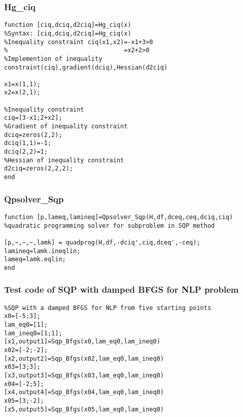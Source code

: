 \subsubsection{\bfseries Hg_ciq }
\label{6.5.6}
{\setmainfont{Courier New Bold} \scriptsize         
\begin{lstlisting}
function [ciq,dciq,d2ciq]=Hg_ciq(x)
%Syntax: [ciq,dciq,d2ciq]=Hg_ciq(x)
%Inequality constraint ciq(x1,x2)=-x1+3>0
%                                =x2+2>0
%Implemention of inequality constraint(ciq),gradient(dciq),Hessian(d2ciq)

x1=x(1,1);
x2=x(2,1);

%Inequality constraint 
ciq=[3-x1;2+x2];
%Gradient of inequality constraint
dciq=zeros(2,2);
dciq(1,1)=-1;
dciq(2,2)=1;
%Hessian of inequality constraint
d2ciq=zeros(2,2,2);
end

\end{lstlisting}}
\subsubsection{\bfseries Qpsolver_Sqp }
\label{6.5.7}
{\setmainfont{Courier New Bold} \scriptsize         
\begin{lstlisting}
function [p,lameq,lamineq]=Qpsolver_Sqp(H,df,dceq,ceq,dciq,ciq)
%quadratic programming solver for subproblem in SQP method

[p,~,~,~,lamk] = quadprog(H,df,-dciq',ciq,dceq',-ceq);
lamineq=lamk.ineqlin;
lameq=lamk.eqlin;
end

\end{lstlisting}}

\subsubsection{\bfseries Test code of SQP with damped BFGS for NLP problem}
\label{6.5.8}
{\setmainfont{Courier New Bold} \scriptsize         
\begin{lstlisting}
%SQP with a damped BFGS for NLP from five starting points
x0=[-5;3];
lam_eq0=[1];
lam_ineq0=[1;1];
[x1,output1]=Sqp_Bfgs(x0,lam_eq0,lam_ineq0)
x02=[-2;-2];
[x2,output2]=Sqp_Bfgs(x02,lam_eq0,lam_ineq0)
x03=[3;3];
[x3,output3]=Sqp_Bfgs(x03,lam_eq0,lam_ineq0)
x04=[-2;5];
[x4,output4]=Sqp_Bfgs(x04,lam_eq0,lam_ineq0)
x05=[3;-2];
[x5,output5]=Sqp_Bfgs(x05,lam_eq0,lam_ineq0)

\end{lstlisting}}

